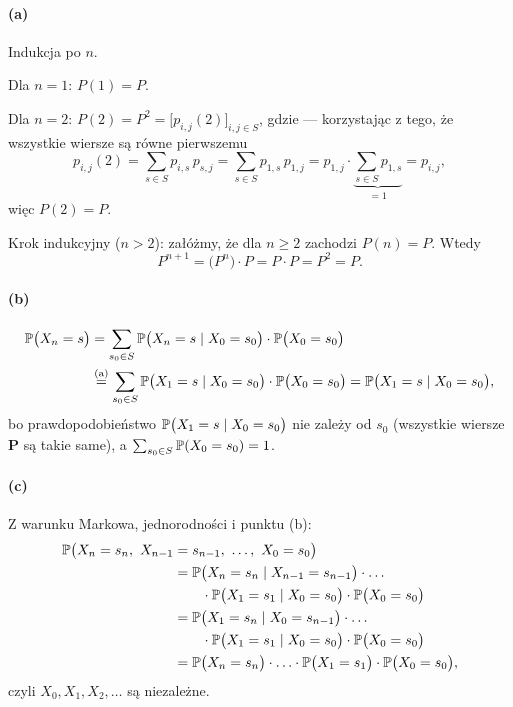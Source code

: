 \documentclass[dvipsnames]{book}
\begin{document}
\paragraph{(a)} Indukcja po $n$.

Dla $n = 1$: $P(1) = P$.

Dla $n = 2$: $P(2) = P^2 = \big[p_{i,j}(2)\big]_{i,j \in S}$, gdzie --- korzystając
z tego, że wszystkie wiersze są równe pierwszemu
\[
  p_{i,j}(2) = \sum_{s \in S} p_{i,s} \, p_{s,j}
             = \sum_{s \in S} p_{1,s} \, p_{1,j}
             = p_{1,j} \cdot \underbrace{\sum_{s \in S} p_{1,s}}_{= 1}
             = p_{i,j},
\]
więc $P(2) = P$.

Krok indukcyjny ($n > 2$): załóżmy, że dla $n \geq 2$ zachodzi $P(n) = P$. Wtedy
\[
  P^{n+1} = \big(P^n\big) \cdot P = P \cdot P = P^2 = P.
\]

\paragraph{(b)}
\begin{align*}
  \P\big(X_n = s\big)
  &= \sum_{s_0 \in S} \P\big(X_n = s \mid X_0 = s_0\big) \cdot \P\big(X_0 = s_0\big) \\
  &\overset{\text{(a)}}{=} \sum_{s_0 \in S} \P\big(X_1 = s \mid X_0 = s_0\big) \cdot \P\big(X_0 = s_0\big)
   = \P\big(X_1 = s \mid X_0 = s_0\big),
\end{align*}
bo prawdopodobieństwo $\P\big(X_1 = s \mid X_0 = s_0\big)$ nie zależy od $s_0$
(wszystkie wiersze $\mathbf{P}$ są takie same), a $\sum_{s_0 \in S} \P(X_0 = s_0) = 1$.

\paragraph{(c)} Z warunku Markowa, jednorodności i punktu (b):
\begin{align*}
  \P\big(X_n = s_n,\ X_{n-1} &= s_{n-1},\ \ldots,\ X_0 = s_0\big) \\
  &= \P\big(X_n = s_n \mid X_{n-1} = s_{n-1}\big) \cdot \ldots \\
  &\qquad \cdot \P\big(X_1 = s_1 \mid X_0 = s_0\big) \cdot \P\big(X_0 = s_0\big) \\
  &= \P\big(X_1 = s_n \mid X_0 = s_{n-1}\big) \cdot \ldots \\
  &\qquad \cdot \P\big(X_1 = s_1 \mid X_0 = s_0\big) \cdot \P\big(X_0 = s_0\big) \\
  &= \P\big(X_n = s_n\big) \cdot \ldots \cdot \P\big(X_1 = s_1\big) \cdot
     \P\big(X_0 = s_0\big),
\end{align*}
czyli $X_0, X_1, X_2, \ldots$ są niezależne.
\end{document}
